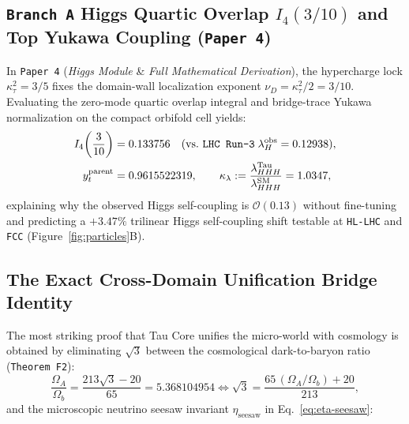 \documentclass[11pt,a4paper]{article}
\begin{document}
\subsection{\texttt{Branch A} Higgs Quartic Overlap $I_4(3/10)$ and Top Yukawa Coupling (\texttt{Paper 4})}

In \texttt{Paper 4} (\emph{Higgs Module} \& \emph{Full Mathematical Derivation}), the hypercharge lock $\kappa_\tau^2 = 3/5$ fixes the domain-wall localization exponent $\nu_D = \kappa_\tau^2/2 = 3/10$. Evaluating the zero-mode quartic overlap integral and bridge-trace Yukawa normalization on the compact orbifold cell yields:
\begin{equation}
\begin{aligned}
I_4\!\left(\frac{3}{10}\right) &= 0.133756\quad(\text{vs.\ \texttt{LHC Run-3}}\;\lambda_H^{\mathrm{obs}} = 0.12938),\\
y_t^{\mathrm{parent}} &= 0.9615522319,\qquad
\kappa_\lambda := \frac{\lambda_{HHH}^{\mathrm{Tau}}}{\lambda_{HHH}^{\mathrm{SM}}} = 1.0347,
\end{aligned}
\label{eq:higgs-top}
\end{equation}
explaining why the observed Higgs self-coupling is $\mathcal{O}(0.13)$ without fine-tuning and predicting a $+3.47\%$ trilinear Higgs self-coupling shift testable at \texttt{HL-LHC} and \texttt{FCC} (Figure~\ref{fig:particles}B).

\subsection{The Exact Cross-Domain Unification Bridge Identity}

The most striking proof that Tau Core unifies the micro-world with cosmology is obtained by eliminating $\sqrt{3}$ between the cosmological dark-to-baryon ratio (\texttt{Theorem F2}):
\begin{equation}
\frac{\Omega_A}{\Omega_b} = \frac{213\sqrt{3}-20}{65} = 5.368104954
\iff \sqrt{3} = \frac{65\,(\Omega_A/\Omega_b) + 20}{213},
\end{equation}
and the microscopic neutrino seesaw invariant $\eta_{\mathrm{seesaw}}$ in Eq.~\eqref{eq:eta-seesaw}:
\end{document}
